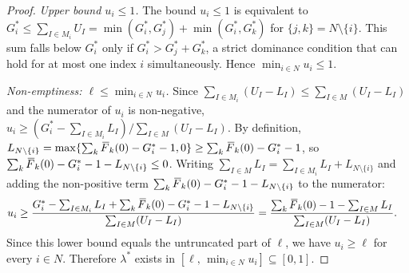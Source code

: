 \documentclass[10pt,a4paper]{amsart}
\newcommand{\F}{\,\overline{\kern-0.175em F\kern-0em}}
\newcommand{\I}{{I}}
\newcommand{\M}{{M}}
\newcommand{\N}{{N}}
\begin{document}
\begin{proof}
\smallskip
\noindent\textit{Upper bound $u_i\le1$.}
The bound $u_i\le1$ is equivalent to
$G_i^*\le\sum_{\I\in\M_i}U_\I=\min(G_i^*,G_j^*)+\min(G_i^*,G_k^*)$ for
$\{j,k\}=\N\setminus\{i\}$. This sum falls below $G_i^*$ only if
$G_i^*>G_j^*+G_k^*$, a strict dominance condition that can hold for at most
one index $i$ simultaneously. Hence $\min_{i\in\N}u_i\le1$.

\smallskip
\noindent\textit{Non-emptiness: $\ell\le\min_{i\in\N}u_i$.}
Since $\sum_{\I\in\M_i}(U_\I-L_\I)\le\sum_{\I\in\M}(U_\I-L_\I)$ and the
numerator of $u_i$ is non-negative, $u_i\ge(G_i^*-\sum_{\I\in\M_i}L_\I)/
\sum_{\I\in\M}(U_\I-L_\I)$.
By definition, $L_{\N\setminus\{i\}}=\max\{\sum_k\F_k(0)-G_i^*-1,0\}\ge
\sum_k\F_k(0)-G_i^*-1$, so
$\sum_k\F_k(0)-G_i^*-1-L_{\N\setminus\{i\}}\le0$. Writing
$\sum_{\I\in\M}L_\I=\sum_{\I\in\M_i}L_\I+L_{\N\setminus\{i\}}$ and adding
the non-positive term $\sum_k\F_k(0)-G_i^*-1-L_{\N\setminus\{i\}}$ to the
numerator:
\begin{align*}
u_i
&\ge\frac{G_i^*-\sum_{\I\in\M_i}L_\I
         +\sum_k\F_k(0)-G_i^*-1-L_{\N\setminus\{i\}}}
        {\sum_{\I\in\M}(U_\I-L_\I)}
=\frac{\sum_k\F_k(0)-1-\sum_{\I\in\M}L_\I}{\sum_{\I\in\M}(U_\I-L_\I)}.
\end{align*}
Since this lower bound equals the untruncated part of $\ell$, we have
$u_i\ge\ell$ for every $i\in\N$. Therefore $\lambda^*$ exists in
$[\ell,\,\min_{i\in\N}u_i]\subseteq[0,1]$.
\end{proof}
\end{document}
